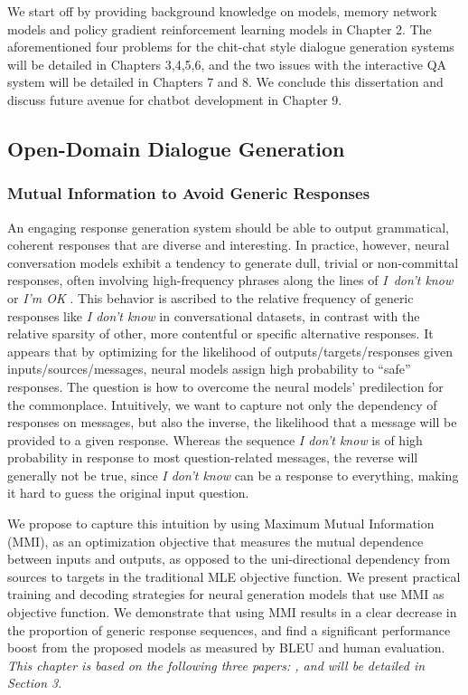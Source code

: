 We start off by providing background knowledge on \sts models, memory network models and policy gradient reinforcement learning models in Chapter 2. 
The aforementioned four problems for the
chit-chat style
 dialogue generation systems will be detailed in Chapters 3,4,5,6,
 and the two issues with the interactive QA system will be detailed in Chapters 7 and 8. 
 We conclude this dissertation and discuss future avenue for chatbot development in Chapter 9.
 
 
\subsection{Open-Domain Dialogue Generation}
\subsubsection*{Mutual Information to Avoid Generic Responses} 
An engaging response generation system should be able to output grammatical, coherent responses that are diverse and interesting.
In practice, however,  neural conversation models exhibit a tendency to generate dull, trivial or non-committal responses, often involving high-frequency phrases along the lines of \textit{I~don't know} or  \textit{I'm OK} \cite{sordoni2015neural,serban2015hierarchical,vinyals2015neural}. 
This behavior is ascribed to the relative frequency of generic responses like 
 \textit{I don't know} in conversational datasets, in contrast with the relative sparsity of other, more contentful or specific alternative responses.
 It appears that by optimizing for the likelihood of outputs/targets/responses given inputs/sources/messages, 
neural models assign high probability to ``safe'' responses. 
The question is how to overcome the neural models' predilection for the commonplace. Intuitively, we want to capture not only the dependency of responses on messages, but also the inverse, the likelihood that a message will be provided to a given response. Whereas the sequence  \textit{I don't know} is of high probability in response to most question-related messages, the reverse will generally not be true, since \textit{I don't know}  can be a response to everything, making it hard to guess the original input question. 

We propose to capture this intuition by using Maximum Mutual Information (MMI), as an optimization objective that measures the mutual dependence between inputs and outputs, as opposed to 
the uni-directional dependency from sources to targets in the traditional MLE objective function.
We present practical training and decoding strategies for neural generation models that use MMI as objective function.
We demonstrate that using MMI results in a clear decrease in the proportion of generic response sequences, and 
find a significant performance boost from the proposed models as measured by  BLEU \cite{papineni2002bleu} and human evaluation.
{\it This chapter is based on the following three papers: \cite{li2015diversity,li2016simple,li2017learning}, and will be detailed in Section 3}. 

